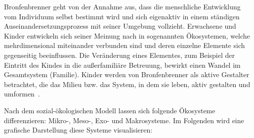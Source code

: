\documentclass[12pt,a4paper]{article}
\begin{document}
	Bronfenbrenner geht von der Annahme aus, dass die menschliche Entwicklung vom Individuum selbst bestimmt wird und sich eigenaktiv in einem ständigen Auseinandersetzungsprozess mit seiner Umgebung vollzieht. Erwachsene und Kinder entwickeln sich seiner Meinung nach in sogenannten Ökosystemen, welche mehrdimensional miteinander verbunden sind und deren einzelne Elemente sich gegenseitig beeinflussen. Die Veränderung eines Elementes, zum Beispiel der Eintritt des Kindes in die außerfamiliäre Betreuung, bewirkt einen Wandel im Gesamtsystem (Familie). Kinder werden von Bronfenbrenner als aktive Gestalter betrachtet, die das Milieu bzw. das System, in dem sie leben, aktiv gestalten und umformen~\parencite[S.~37-38]{Bronfenbrenner}. 
	
Nach dem sozial-ökologischen Modell lassen sich folgende Ökosysteme differenzieren: Mikro-, Meso-, Exo- und Makrosysteme. Im Folgenden wird eine grafische Darstellung diese Systeme visualisieren:
\end{document}
